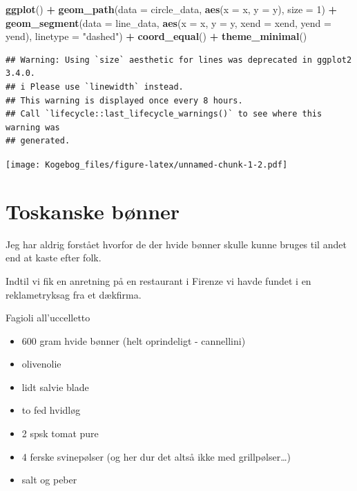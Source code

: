 \documentclass[
]{book}
\newenvironment{Shaded}{\begin{snugshade}}{\end{snugshade}}
\newcommand{\AttributeTok}[1]{\textcolor[rgb]{0.13,0.29,0.53}{#1}}
\newcommand{\DecValTok}[1]{\textcolor[rgb]{0.00,0.00,0.81}{#1}}
\newcommand{\FunctionTok}[1]{\textcolor[rgb]{0.13,0.29,0.53}{\textbf{#1}}}
\newcommand{\NormalTok}[1]{#1}
\newcommand{\SpecialCharTok}[1]{\textcolor[rgb]{0.81,0.36,0.00}{\textbf{#1}}}
\newcommand{\StringTok}[1]{\textcolor[rgb]{0.31,0.60,0.02}{#1}}
\providecommand{\tightlist}{%
  \setlength{\itemsep}{0pt}\setlength{\parskip}{0pt}}
\begin{document}
\begin{Shaded}
\begin{Highlighting}[]
\FunctionTok{ggplot}\NormalTok{() }\SpecialCharTok{+}
  \FunctionTok{geom\_path}\NormalTok{(}\AttributeTok{data =}\NormalTok{ circle\_data, }\FunctionTok{aes}\NormalTok{(}\AttributeTok{x =}\NormalTok{ x, }\AttributeTok{y =}\NormalTok{ y), }\AttributeTok{size =} \DecValTok{1}\NormalTok{) }\SpecialCharTok{+}
  \FunctionTok{geom\_segment}\NormalTok{(}\AttributeTok{data =}\NormalTok{ line\_data, }\FunctionTok{aes}\NormalTok{(}\AttributeTok{x =}\NormalTok{ x, }\AttributeTok{y =}\NormalTok{ y, }\AttributeTok{xend =}\NormalTok{ xend, }\AttributeTok{yend =}\NormalTok{ yend), }\AttributeTok{linetype =} \StringTok{"dashed"}\NormalTok{) }\SpecialCharTok{+}
  \FunctionTok{coord\_equal}\NormalTok{() }\SpecialCharTok{+}
  \FunctionTok{theme\_minimal}\NormalTok{()}
\end{Highlighting}
\end{Shaded}

\begin{verbatim}
## Warning: Using `size` aesthetic for lines was deprecated in ggplot2 3.4.0.
## i Please use `linewidth` instead.
## This warning is displayed once every 8 hours.
## Call `lifecycle::last_lifecycle_warnings()` to see where this warning was
## generated.
\end{verbatim}

\texttt{[image: Kogebog\_files/figure-latex/unnamed-chunk-1-2.pdf]}

\hypertarget{toskanske-buxf8nner}{%
\section{Toskanske bønner}\label{toskanske-buxf8nner}}

Jeg har aldrig forstået hvorfor de der hvide bønner skulle kunne bruges til
andet end at kaste efter folk.

Indtil vi fik en anretning på en restaurant i Firenze vi havde fundet i en
reklametryksag fra et dækfirma.

Fagioli all'uccelletto

\begin{itemize}
\tightlist
\item
  600 gram hvide bønner (helt oprindeligt - cannellini)
\item
  olivenolie
\item
  lidt salvie blade
\item
  to fed hvidløg
\item
  2 spsk tomat pure
\item
  4 ferske svinepølser (og her dur det altså ikke med grillpølser\ldots)
\item
  salt og peber
\end{itemize}
\end{document}
